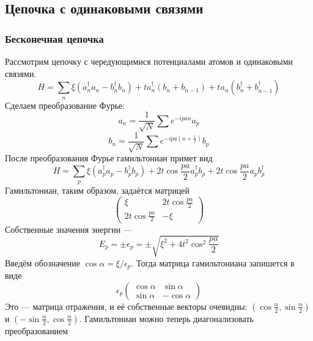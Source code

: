 \subsection{Цепочка с одинаковыми связями}
\subsubsection{Бесконечная цепочка}
Рассмотрим цепочку с чередующимися потенциалами атомов и одинаковыми связями.
\begin{equation}
	H = \sum_n \xi(a_n^\dagger a_n - b_n^\dagger b_n) + ta_n^\dagger(b_n + b_{n-1}) +
			ta_n(b_n^\dagger + b_{n-1}^\dagger)
\end{equation}
Сделаем преобразование Фурье:
\begin{equation}
	a_n = \frac{1}{\sqrt{N}} \sum e^{-ipan} a_p
\end{equation}
\begin{equation}
	b_n = \frac{1}{\sqrt{N}} \sum e^{-ipa(n+\frac{1}{2})} b_p
\end{equation}
После преобразования Фурье гамильтониан примет вид
\begin{equation}
	H = \sum_p \xi (a_p^\dagger a_p - b_p^\dagger b_p) + 2t\cos{\frac{pa}{2}} a_p^\dagger b_p
			+ 2t\cos{\frac{pa}{2}}a_pb_p^\dagger
\end{equation}
Гамильтониан, таким образом, задаётся матрицей
\begin{equation}
	\left(\begin{matrix}
		\xi & 2t\cos{\frac{pa}{2}} \\
		2t\cos{\frac{pa}{2}} & -\xi
	\end{matrix}\right)
\end{equation}
Собственные значения энергии ---
\begin{equation}
	E_p = \pm \epsilon_p = \pm \sqrt{\xi^2 + 4t^2 \cos^2{\frac{pa}{2}}}
\end{equation}
Введём обозначение $\cos\alpha = \xi/\epsilon_p$. Тогда матрица гамильтониана запишется 
в виде
\begin{equation}
	\epsilon_p \left(
		\begin{matrix}
			\cos{\alpha} & \sin{\alpha} \\
			\sin{\alpha} & -\cos{\alpha} 
		\end{matrix}
		\right)
\end{equation}
Это --- матрица отражения, и её собственные векторы очевидны: 
$(\cos{\frac{\alpha}{2}}, \sin{\frac{\alpha}{2}})$ и 
$(-\sin{\frac{\alpha}{2}}, \cos{\frac{\alpha}{2}})$.
Гамильтониан можно теперь диагонализовать преобразованием
